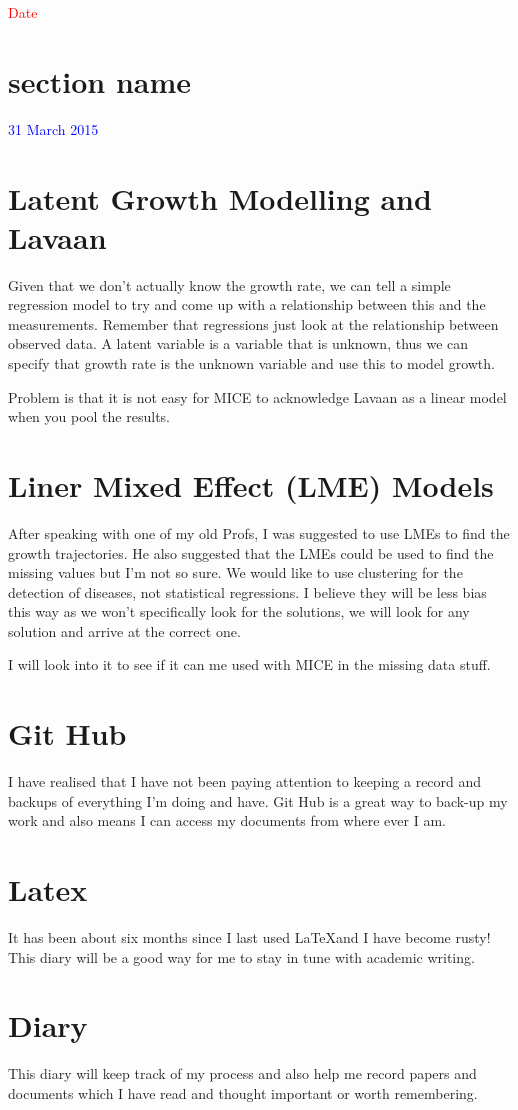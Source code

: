 \documentclass[12pt,letterpaper]{article}
\begin{document}
\univlogo



\textcolor{red}{\Huge Date}
\section*{section name} %
\label{sec:section_name}


\textcolor{blue}{\Huge 31 March 2015}
\section*{Latent Growth Modelling and Lavaan} %
\label{sec:latent_growth}
Given that we don't actually know the growth rate, we can tell a simple regression model to try and come up with a relationship between this and the measurements. Remember that regressions just look at the relationship between observed data. A latent variable is a variable that is unknown, thus we can specify that growth rate is the unknown variable and use this to model growth. 

Problem is that it is not easy for MICE to acknowledge Lavaan as a linear model when you pool the results.  
\section*{Liner Mixed Effect (LME) Models} %
\label{sec:liner_mixed_effec_}
After speaking with one of my old Profs, I was suggested to use LMEs to find the growth trajectories. He also suggested that the LMEs could be used to find the missing values but I'm not so sure. We would like to use clustering for the detection of diseases, not statistical regressions. I believe they will be less bias this way as we won't specifically look for the solutions, we will look for any solution and arrive at the correct one. 

I will look into it to see if it can me used with MICE in the missing data stuff. 
\section*{Git Hub} %
\label{sec:git_hub}
I have realised that I have not been paying attention to keeping a record and backups of everything I'm doing and have. Git Hub is a great way to back-up my work and also means I can access my documents from where ever I am. 
\section*{Latex} %
\label{sec:latex}
It has been about six months since I last used \LaTeX and I have become rusty! This diary will be a good way for me to stay in tune with academic writing. 
\section*{Diary} %
\label{sec:diary}
This diary will keep track of my process and also help me record papers and documents which I have read and thought important or worth remembering. 
\end{document}

